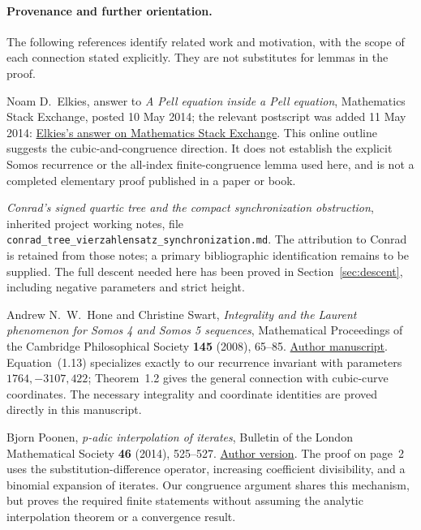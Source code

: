 \documentclass[11pt,a4paper]{article}
\theoremstyle{definition}
\begin{document}
\paragraph{Provenance and further orientation.}
The following references identify related work and motivation, with
the scope of each connection stated explicitly. They are not substitutes
for lemmas in the proof.
\begin{enumerate}[label={[\arabic*]}]
\item Noam D.~Elkies, answer to \emph{A Pell equation inside a Pell
equation}, Mathematics Stack Exchange, posted 10 May 2014; the relevant
postscript was added 11 May 2014:
\href{https://math.stackexchange.com/a/788692}{Elkies's answer on Mathematics Stack Exchange}.
This online outline suggests the cubic-and-congruence direction.
It does not establish the explicit Somos recurrence or the all-index
finite-congruence lemma used here, and is not a completed elementary
proof published in a paper or book.
\item \emph{Conrad's signed quartic tree and the compact synchronization
obstruction}, inherited project working notes, file
\texttt{conrad\_tree\_vierzahlensatz\_synchronization.md}.
The attribution to Conrad is retained from those notes; a primary
bibliographic identification remains to be supplied. The full descent
needed here has been proved in Section~\ref{sec:descent}, including
negative parameters and strict height.
\item Andrew N.~W.~Hone and Christine Swart,
\emph{Integrality and the Laurent phenomenon for Somos 4 and Somos 5
sequences}, Mathematical Proceedings of the Cambridge Philosophical
Society \textbf{145} (2008), 65--85.
\href{https://kar.kent.ac.uk/id/document/1522}{Author manuscript}.
Equation~(1.13) specializes exactly to our recurrence invariant with
parameters \(1764,-3107,422\); Theorem~1.2 gives the general connection
with cubic-curve coordinates. The necessary integrality and coordinate
identities are proved directly in this manuscript.
\item Bjorn Poonen, \emph{p-adic interpolation of iterates}, Bulletin
of the London Mathematical Society \textbf{46} (2014), 525--527.
\href{https://math.mit.edu/~poonen/papers/p-iteration.pdf}{Author version}.
The proof on page~2 uses the substitution-difference operator,
increasing coefficient divisibility, and a binomial expansion of
iterates. Our congruence argument shares this mechanism, but proves
the required finite statements without assuming the analytic
interpolation theorem or a convergence result.
\end{enumerate}
\end{document}
